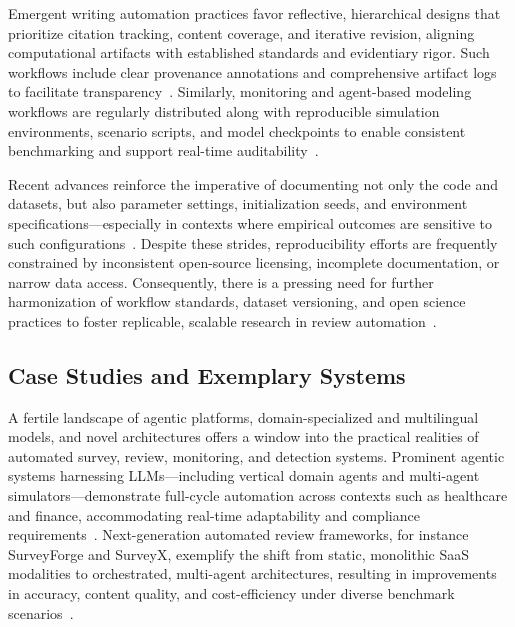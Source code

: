 \documentclass[sigconf]{acmart}
\begin{document}
Emergent writing automation practices favor reflective, hierarchical designs that prioritize citation tracking, content coverage, and iterative revision, aligning computational artifacts with established standards and evidentiary rigor. Such workflows include clear provenance annotations and comprehensive artifact logs to facilitate transparency~\cite{ref78,ref87,ref91,ref92,ref98,ref100,ref102,ref105,ref112,ref113,ref114,ref115}. Similarly, monitoring and agent-based modeling workflows are regularly distributed along with reproducible simulation environments, scenario scripts, and model checkpoints to enable consistent benchmarking and support real-time auditability~\cite{ref91,ref92,ref98,ref104,ref105,ref113,ref114,ref115}.

Recent advances reinforce the imperative of documenting not only the code and datasets, but also parameter settings, initialization seeds, and environment specifications—especially in contexts where empirical outcomes are sensitive to such configurations~\cite{ref92,ref100,ref112}. Despite these strides, reproducibility efforts are frequently constrained by inconsistent open-source licensing, incomplete documentation, or narrow data access. Consequently, there is a pressing need for further harmonization of workflow standards, dataset versioning, and open science practices to foster replicable, scalable research in review automation~\cite{ref113,ref114,ref115}.

\subsection{Case Studies and Exemplary Systems}

A fertile landscape of agentic platforms, domain-specialized and multilingual models, and novel architectures offers a window into the practical realities of automated survey, review, monitoring, and detection systems. Prominent agentic systems harnessing LLMs—including vertical domain agents and multi-agent simulators—demonstrate full-cycle automation across contexts such as healthcare and finance, accommodating real-time adaptability and compliance requirements~\cite{ref85,ref86,ref87,ref90,ref91,ref92,ref93,ref94,ref95}. Next-generation automated review frameworks, for instance SurveyForge and SurveyX, exemplify the shift from static, monolithic SaaS modalities to orchestrated, multi-agent architectures, resulting in improvements in accuracy, content quality, and cost-efficiency under diverse benchmark scenarios~\cite{ref87,ref98,ref99,ref100,ref104,ref105}.
\end{document}
